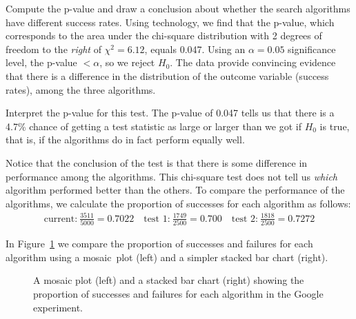 \begin{examplewrap}
\begin{nexample}{Compute the p-value and draw a conclusion about whether the search algorithms have different success rates.}
Using technology, we find that the p-value, which corresponds to the area under the chi-square distribution with 2 degrees of freedom to the \emph{right} of $\chi^2=6.12$, equals 0.047.  Using an $\alpha=0.05$ significance level, the p-value $< \alpha$, so we reject $H_0$.  The data provide convincing evidence that there is a difference in the distribution of the outcome variable (success rates), among the three algorithms.
\end{nexample}
\end{examplewrap}


\begin{examplewrap}
\begin{nexample}{Interpret the p-value for this test.}
The p-value of 0.047 tells us that there is a 4.7\% chance of getting a test statistic as large or larger than we got if $H_0$ is true, that is, if the algorithms do in fact perform equally well.  
\end{nexample}
\end{examplewrap}


Notice that the conclusion of the test is that there is some difference in performance among the algorithms.  This chi-square test does not tell us \emph{which} algorithm performed better than the others.  To compare the performance of the algorithms, we calculate the proportion of successes for each algorithm as follows:  
\begin{align*}
\text{current:}~ \frac{3511}{5000} = 0.7022 \quad \text{test 1:}~ \frac{1749}{2500} = 0.700 \quad \text{test 2:}~ \frac{1818}{2500} = 0.7272
\end{align*}

In Figure~\ref{gsearchSegBar} we compare the proportion of successes and failures for each algorithm using a mosaic~plot (left) and a simpler stacked bar chart (right).

\begin{figure}[h]
\centering
{}
\caption{A mosaic plot (left) and a stacked bar chart (right) showing the proportion of successes and failures for each algorithm in the Google experiment.}
\label{gsearchSegBar}
\end{figure}

